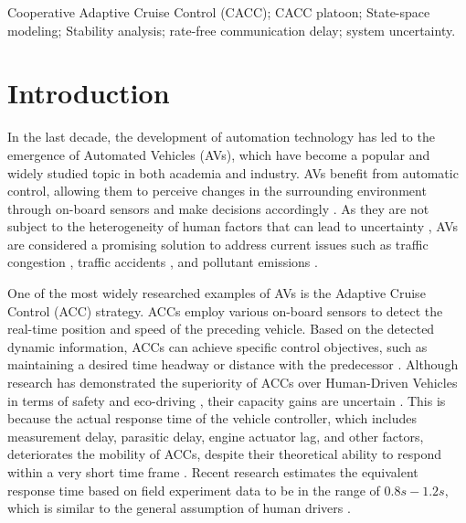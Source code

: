 \documentclass[a4paper]{cas-sc}
\begin{document}
\begin{keywords}
  Cooperative Adaptive Cruise Control (CACC); CACC platoon; State-space modeling; Stability analysis; rate-free communication delay; system uncertainty.
\end{keywords}


\maketitle

\section{Introduction}
\label{Section 1}

In the last decade, the development of automation technology has led to the emergence of Automated Vehicles (AVs), which have become a popular and widely studied topic in both academia and industry. AVs benefit from automatic control, allowing them to perceive changes in the surrounding environment through on-board sensors and make decisions accordingly \citep{SHLADOVER1978}. As they are not subject to the heterogeneity of human factors that can lead to uncertainty \citep{Arem2016a,Yu2021a,vanLint2016}, AVs are considered a promising solution to address current issues such as traffic congestion \citep{Zhao2020,Wang2019b}, traffic accidents \citep{Ruan2022,Wang2018g}, and pollutant emissions \citep{Silgu2020,Wang2020f,wang2022worst}.

One of the most widely researched examples of AVs is the Adaptive Cruise Control (ACC) strategy. ACCs employ various on-board sensors to detect the real-time position and speed of the preceding vehicle. Based on the detected dynamic information, ACCs can achieve specific control objectives, such as maintaining a desired time headway or distance with the predecessor \citep{fancher1997tests, marsden2001towards}. Although research has demonstrated the superiority of ACCs over Human-Driven Vehicles in terms of safety \citep{vahidi2003research, mahdinia2020safety} and eco-driving \citep{wang2014potential, li2019ecological}, their capacity gains are uncertain \citep{vander2002effects, shang2021impacts}. This is because the actual response time of the vehicle controller, which includes measurement delay, parasitic delay, engine actuator lag, and other factors, deteriorates the mobility of ACCs, despite their theoretical ability to respond within a very short time frame \citep{xiao2008stability}. Recent research estimates the equivalent response time based on field experiment data to be in the range of $0.8s-1.2s$, which is similar to the general assumption of human drivers \citep{makridis2019response}.
\end{document}
